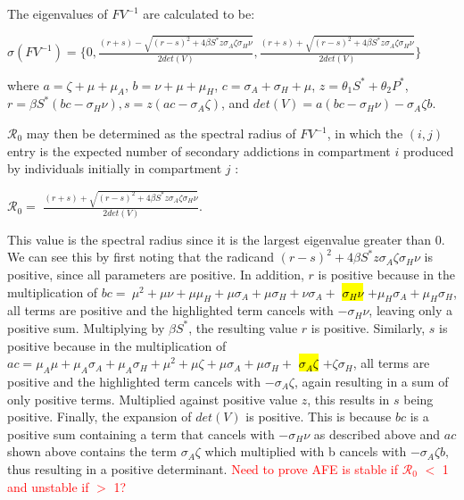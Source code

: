 \documentclass[12pt]{article}
\begin{document}
The eigenvalues of $FV^{-1}$ are calculated to be: 
\begin{center}
$\sigma (FV^{-1}) = \{0, \frac{(r+s)-\sqrt{(r-s)^2+4\beta S^* z  \sigma_A \zeta \sigma_H \nu}}{2det(V)} 
, \frac{(r+s)+\sqrt{(r-s)^2+4\beta S^* z  \sigma_A \zeta \sigma_H \nu}}{2det(V)} 
\}$
\end{center}

where $a=\zeta +\mu + \mu_A$, $b=\nu + \mu + \mu_H$, $c= \sigma_A + \sigma_H +\mu$, $z=\theta_1 S^* + \theta_2 P^*$, $ r=\beta S^* (bc-\sigma_H \nu), s=z(ac-\sigma_{A} \zeta)$, and $det(V)=a(bc-\sigma_H\nu)-\sigma_A\zeta b$.

$\mathscr{R}_0$ may then be determined as the spectral radius of $FV^{-1}$, in which the $(i,j)$ entry is the expected number of secondary addictions in compartment $i$ produced by individuals initially in compartment $j$ :
\begin{center}
$\mathscr{R}_0=$ $\frac{(r+s)+\sqrt{(r-s)^2+4\beta S^* z  \sigma_A \zeta \sigma_H \nu}}{2det(V)}. $
\end{center}

This value is the spectral radius since it is the largest eigenvalue greater than 0. We can see this by first noting that the radicand $(r-s)^2+4\beta S^* z  \sigma_{A} \zeta \sigma_{H} \nu$ is positive, since all parameters are positive. In addition, $r$ is positive because in the multiplication of $bc=\ \mu^{2} + \mu \nu+ \mu \mu_{H} + \mu \sigma_{A} + \mu \sigma_{H}+ \nu \sigma_{A}+$ \hl{$ \sigma_{H} \nu $} $+ \mu_{H}\sigma_{A}+\mu_{H}\sigma_{H}$, all terms are positive and the highlighted term cancels with $-\sigma_{H} \nu$, leaving only a positive sum. Multiplying by $\beta S^*$, the resulting value $r$ is positive. Similarly, $s$ is positive because in the multiplication of $ac= \mu_{A} \mu+ \mu_{A} \sigma_{A}+\mu_{A} \sigma_{H} +\mu^{2} +\mu \zeta+ \mu \sigma_{A}+\mu \sigma_{H}+$ \hl{$\sigma_{A} \zeta$} $+ \zeta \sigma_{H}$, all terms are positive and the highlighted term cancels with $-\sigma_{A} \zeta$, again resulting in a sum of only positive terms. Multiplied against positive value $z$, this results in $s$ being positive. Finally, the expansion of $det(V)$ is positive. This is because $bc$ is a positive sum containing a term that cancels with $-\sigma_{H} \nu$ as described above and $ac$ shown above contains the term $\sigma_{A} \zeta$ which multiplied with b cancels with $-\sigma_A\zeta b,$ thus resulting in a positive determinant. \textcolor{red}{Need to prove AFE is stable if $\mathscr{R}_0$ $<$ 1 and unstable if $>$ 1?}
\end{document}
